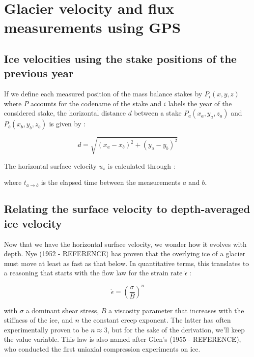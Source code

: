 \documentclass[11pt]{report}
\begin{document}
\newcommand{\fraction}[2]{\raisebox{0.5ex}{#1} \slash \raisebox{-0.5ex}{#2}}



\section*{Glacier velocity and flux measurements using GPS}



\subsection*{Ice velocities using the stake positions of the previous year}

If we define each measured position of the mass balance stakes by $P_i(x,y,z)$ where $P$ accounts for the codename of the stake and $i$ labels the year of the considered stake, the horizontal distance $d$ between a stake $P_a(x_a, y_a, z_a)$ and $P_b(x_b, y_b, z_b)$ is given by :

\[d = \sqrt{(x_a - x_b)^2 + (y_a - y_b)^2}\]

The horizontal surface velocity $u_s$ is calculated through :

\begin{center}
\end{center}

where $t_{a \rightarrow b}$ is the elapsed time between the measurements $a$ and $b$.


\subsection*{Relating the surface velocity to depth-averaged ice velocity}

Now that we have the horizontal surface velocity, we wonder how it evolves with depth. Nye (1952 - REFERENCE) has proven that the overlying ice of a glacier must move at least as fast as that below. In quantitative terms, this translates to a reasoning that starts with the flow law for the strain rate $\dot{\epsilon}$ :

\[\dot{\epsilon} = \left( \frac{\sigma}{B} \right)^n\]

with $\sigma$ a dominant shear stress, $B$ a viscosity parameter that increases with the stiffness of the ice, and $n$ the constant creep exponent. The latter has often experimentally proven to be $n \approx 3$, but for the sake of the derivation, we'll keep the value variable.
This law is also named after Glen's (1955 - REFERENCE), who conducted the first uniaxial compression experiments on ice.
\end{document}
